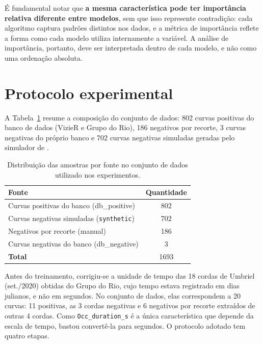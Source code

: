É fundamental notar que \textbf{a mesma característica pode ter importância relativa diferente entre modelos}, sem que isso represente contradição: cada algoritmo captura padrões distintos nos dados, e a métrica de importância reflete a forma como cada modelo utiliza internamente a variável. A análise de importância, portanto, deve ser interpretada dentro de cada modelo, e não como uma ordenação absoluta.

\section{Protocolo experimental}
\label{sec:config_experimental}

A Tabela~\ref{tab:dataset_fonte} resume a composição do conjunto de dados: 802 curvas positivas do banco de dados (VizieR e Grupo do Rio), 186 negativos por recorte, 3 curvas negativas do próprio banco e 702 curvas negativas simuladas geradas pelo simulador de \citet{Simulator}.

\begin{table}[htbp]
\centering
\caption{Distribuição das amostras por fonte no conjunto de dados utilizado nos experimentos.}
\label{tab:dataset_fonte}
\begin{tabular}{lc}
\hline
\textbf{Fonte} & \textbf{Quantidade} \\
\hline
Curvas positivas do banco (db\_positive)   & 802 \\
Curvas negativas simuladas (\texttt{synthetic})    & 702 \\
Negativos por recorte (manual)            & 186 \\
Curvas negativas do banco (db\_negative)  & 3 \\
\hline
\textbf{Total} & 1693 \\
\hline
\end{tabular}
\end{table}

Antes do treinamento, corrigiu-se a unidade de tempo das 18 cordas de Umbriel (set./2020) obtidas do Grupo do Rio, cujo tempo estava registrado em dias julianos, e não em segundos. No conjunto de dados, elas correspondem a 20 curvas: 11 positivas, as 3 cordas negativas e 6 negativos por recorte extraídos de outras 4 cordas. Como \texttt{Occ\_duration\_s} é a única característica que depende da escala de tempo, bastou convertê-la para segundos. O protocolo adotado tem quatro etapas.


